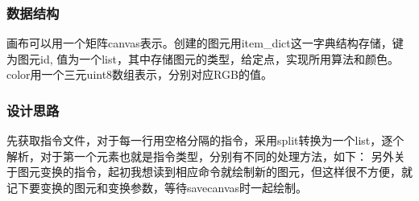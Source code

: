 \documentclass[a4paper,UTF8]{article}
\theoremstyle{definition}
\begin{document}
\subsubsection{数据结构}
画布可以用一个矩阵canvas表示。创建的图元用item\_dict这一字典结构存储，键为图元id,
值为一个list，其中存储图元的类型，给定点，实现所用算法和颜色。
color用一个三元uint8数组表示，分别对应RGB的值。

\subsubsection{设计思路}
先获取指令文件，对于每一行用空格分隔的指令，采用split转换为一个list，逐个解析，对于第一个元素也就是指令类型，分别有不同的处理方法，如下：
另外关于图元变换的指令，起初我想读到相应命令就绘制新的图元，但这样很不方便，就记下要变换的图元和变换参数，等待savecanvas时一起绘制。
\end{document}
